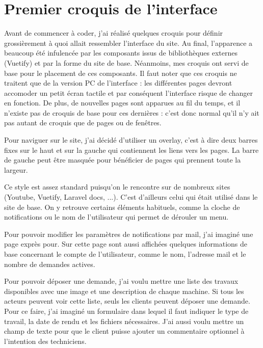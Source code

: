 \documentclass[
    iai, %
    eai, %
]{heig-tb}
\begin{document}
\newpage
\section{Premier croquis de l'interface}
Avant de commencer à coder, j'ai réalisé quelques croquis pour définir grossièrement à quoi allait ressembler l'interface du site.
Au final, l'apparence a beaucoup été infulencée par les composants issus de bibliothèques externes (Vuetify) et par la forme du site de base.
Néanmoins, mes croquis ont servi de base pour le placement de ces composants.
Il faut noter que ces croquis ne traitent que de la version PC de l'interface : les différentes pages devront accomoder un petit écran tactile et par conséquent l'interface risque de changer en fonction.
De plus, de nouvelles pages sont apparues au fil du temps, et il n'existe pas de croquis de base pour ces dernières : c'est donc normal qu'il n'y ait pas autant de croquis que de pages ou de fenêtres.

Pour naviguer sur le site, j'ai décidé d'utiliser un overlay, c'est à dire deux barres fixes sur le haut et sur la gauche qui contiennent les liens vers les pages.
La barre de gauche peut être masquée pour bénéficier de pages qui prennent toute la largeur.


Ce style est assez standard puisqu'on le rencontre sur de nombreux sites (Youtube, Vuetify, Laravel docs, ...).
C'est d'ailleurs celui qui était utilisé dans le site de base.
On y retrouve certains éléments habituels, comme la cloche de notifications ou le nom de l'utilisateur qui permet de dérouler un menu.

\newpage
Pour pouvoir modifier les paramètres de notifications par mail, j'ai imaginé une page exprès pour.
Sur cette page sont aussi affichées quelques informations de base concernant le compte de l'utilisateur, comme le nom, l'adresse mail et le nombre de demandes actives.


Pour pouvoir déposer une demande, j'ai voulu mettre une liste des travaux disponibles avec une image et une description de chaque machine.
Si tous les acteurs peuvent voir cette liste, seuls les clients peuvent déposer une demande.
Pour ce faire, j'ai imaginé un formulaire dans lequel il faut indiquer le type de travail, la date de rendu et les fichiers nécessaires.
J'ai aussi voulu mettre un champ de texte pour que le client puisse ajouter un commentaire optionnel à l'intention des techniciens.
\end{document}
